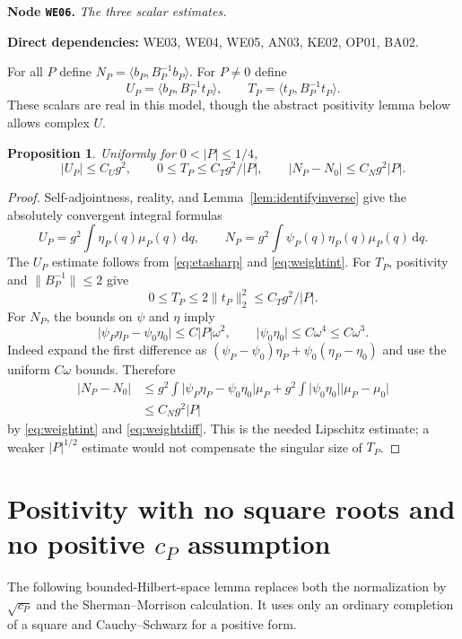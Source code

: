 \documentclass[11pt,a4paper]{article}
\newtheorem{proposition}[theorem]{Proposition}
\theoremstyle{remark}\newtheorem{remark}[theorem]{Remark}
\newcommand{\ip}[2]{\langle #1,#2\rangle}\newcommand{\norm}[1]{\lVert #1\rVert}
\newcommand{\abs}[1]{\lvert #1\rvert}\newcommand{\rankone}[2]{\lvert #1\rangle\langle #2\rvert}
\newcommand{\dd}{\,\mathrm d}\newcommand{\almosteverywhere}{\text{a.e.}}
\newcommand{\node}[3]{\par\Needspace{6\baselineskip}\smallskip\hypertarget{node:#1}{}\label{nodepage:#1}\noindent\textbf{Node \texttt{#1}.} \textit{#2.}\par\noindent\textbf{Direct dependencies:} #3.\par}
\begin{document}
\node{WE06}{The three scalar estimates}{WE03, WE04, WE05, AN03, KE02, OP01, BA02}
For all $P$ define $N_P=\ip{b_P}{B_P^{-1}b_P}$. For $P\ne0$ define
\[
 U_P=\ip{b_P}{B_P^{-1}t_P},\qquad T_P=\ip{t_P}{B_P^{-1}t_P}.
\]
These scalars are real in this model, though the abstract positivity lemma below allows complex $U$.

\begin{proposition}\label{prop:scalars}
Uniformly for $0<\abs P\leq1/4$,
\begin{equation}
 \abs{U_P}\leq C_Ug^2,\qquad
 0\leq T_P\leq C_Tg^2/\abs P,\qquad
 \abs{N_P-N_0}\leq C_Ng^2\abs P.\label{eq:scalarbounds}
\end{equation}
\end{proposition}
\begin{proof}
Self-adjointness, reality, and Lemma~\ref{lem:identifyinverse} give the absolutely convergent integral formulas
\[
 U_P=g^2\int\eta_P(q)\mu_P(q)\dd q,
 \qquad N_P=g^2\int\psi_P(q)\eta_P(q)\mu_P(q)\dd q.
\]
The $U_P$ estimate follows from \eqref{eq:etasharp} and \eqref{eq:weightint}. For $T_P$, positivity and $\norm{B_P^{-1}}\leq2$ give
\[
 0\leq T_P\leq2\norm{t_P}_2^2\leq C_Tg^2/\abs P.
\]
For $N_P$, the bounds on $\psi$ and $\eta$ imply
\[
 \abs{\psi_P\eta_P-\psi_0\eta_0}\leq C\abs P\omega^2,
 \qquad\abs{\psi_0\eta_0}\leq C\omega^4\leq C\omega^3.
\]
Indeed expand the first difference as $(\psi_P-\psi_0)\eta_P+\psi_0(\eta_P-\eta_0)$ and use the uniform $C\omega$ bounds. Therefore
\begin{align*}
 \abs{N_P-N_0}
 &\leq g^2\int\abs{\psi_P\eta_P-\psi_0\eta_0}\mu_P
    +g^2\int\abs{\psi_0\eta_0}\abs{\mu_P-\mu_0}\\
 &\leq C_Ng^2\abs P
\end{align*}
by \eqref{eq:weightint} and \eqref{eq:weightdiff}. This is the needed Lipschitz estimate; a weaker $\abs P^{1/2}$ estimate would not compensate the singular size of $T_P$.
\end{proof}

\section{Positivity with no square roots and no positive \texorpdfstring{$c_P$}{cP} assumption}\label{sec:positivity}
The following bounded-Hilbert-space lemma replaces both the normalization by $\sqrt{c_P}$ and the Sherman--Morrison calculation. It uses only an ordinary completion of a square and Cauchy--Schwarz for a positive form.
\end{document}

